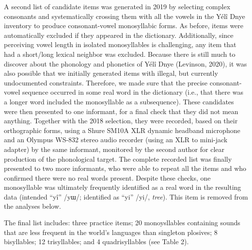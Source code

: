 \documentclass[english,,man,floatsintext]{apa6}
\begin{document}
A second list of candidate items was generated in 2019 by selecting complex consonants and systematically crossing them with all the vowels in the Yélî Dnye inventory to produce consonant-vowel monosyllabic forms. As before, items were automatically excluded if they appeared in the dictionary. Additionally, since perceiving vowel length in isolated monosyllables is challenging, any item that had a short/long lexical neighbor was excluded. Because there is still much to discover about the phonology and phonetics of Yélî Dnye (Levinson, 2020), it was also possible that we initially generated items with illegal, but currently undocumented constraints. Therefore, we made sure that the precise consonant-vowel sequence occurred in some real word in the dictionary (i.e., that there was a longer word included the monosyllable as a subsequence). These candidates were then presented to one informant, for a final check that they did not mean anything. Together with the 2018 selection, they were recorded, based on their orthographic forms, using a Shure SM10A XLR dynamic headband microphone and an Olympus WS-832 stereo audio recorder (using an XLR to mini-jack adapter) by the same informant, monitored by the second author for clear production of the phonological target. The complete recorded list was finally presented to two more informants, who were able to repeat all the items and who confirmed there were no real words present. Despite these checks, one monosyllable was ultimately frequently identified as a real word in the resulting data (intended \enquote{yî} /yɯ/; identified as \enquote{yi} /yi/, \emph{tree}). This item is removed from the analyses below.

The final list includes: three practice items; 20 monoysllables containing sounds that are less frequent in the world's languages than singleton plosives; 8 bisyllables; 12 trisyllables; and 4 quadrisyllables (see Table 2).
\end{document}
